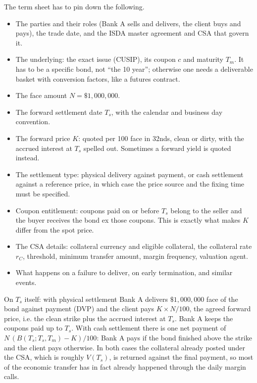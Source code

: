 \documentclass[11pt]{article}
\begin{document}
The term sheet has to pin down the following.

\begin{itemize}
\item The parties and their roles (Bank A sells and delivers, the client buys and pays), the trade date, and the ISDA master agreement and CSA that govern it.
\item The underlying: the exact issue (CUSIP), its coupon $c$ and maturity $T_m$. It has to be a specific bond, not ``the 10 year''; otherwise one needs a deliverable basket with conversion factors, like a futures contract.
\item The face amount $N = \$1{,}000{,}000$.
\item The forward settlement date $T_s$, with the calendar and business day convention.
\item The forward price $K$: quoted per 100 face in 32nds, clean or dirty, with the accrued interest at $T_s$ spelled out. Sometimes a forward yield is quoted instead.
\item The settlement type: physical delivery against payment, or cash settlement against a reference price, in which case the price source and the fixing time must be specified.
\item Coupon entitlement: coupons paid on or before $T_s$ belong to the seller and the buyer receives the bond ex those coupons. This is exactly what makes $K$ differ from the spot price.
\item The CSA details: collateral currency and eligible collateral, the collateral rate $r_C$, threshold, minimum transfer amount, margin frequency, valuation agent.
\item What happens on a failure to deliver, on early termination, and similar events.
\end{itemize}

On $T_s$ itself: with physical settlement Bank A delivers $\$1{,}000{,}000$ face of the bond against payment (DVP) and the client pays $K \times N/100$, the agreed forward price, i.e. the clean strike plus the accrued interest at $T_s$. Bank A keeps the coupons paid up to $T_s$. With cash settlement there is one net payment of $N\,(B(T_s;T_s,T_m) - K)/100$: Bank A pays if the bond finished above the strike and the client pays otherwise. In both cases the collateral already posted under the CSA, which is roughly $V(T_s)$, is returned against the final payment, so most of the economic transfer has in fact already happened through the daily margin calls.
\end{document}
